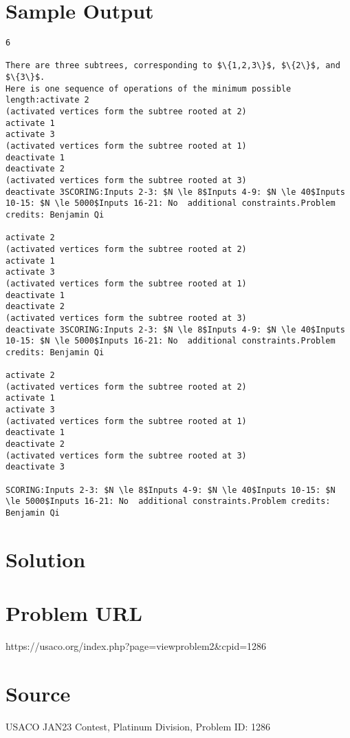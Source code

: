 \documentclass[12pt]{article}
\begin{document}
\section*{Sample Output}
\begin{verbatim}
6

There are three subtrees, corresponding to $\{1,2,3\}$, $\{2\}$, and $\{3\}$.
Here is one sequence of operations of the minimum possible length:activate 2
(activated vertices form the subtree rooted at 2)
activate 1
activate 3
(activated vertices form the subtree rooted at 1)
deactivate 1
deactivate 2
(activated vertices form the subtree rooted at 3)
deactivate 3SCORING:Inputs 2-3: $N \le 8$Inputs 4-9: $N \le 40$Inputs 10-15: $N \le 5000$Inputs 16-21: No  additional constraints.Problem credits: Benjamin Qi

activate 2
(activated vertices form the subtree rooted at 2)
activate 1
activate 3
(activated vertices form the subtree rooted at 1)
deactivate 1
deactivate 2
(activated vertices form the subtree rooted at 3)
deactivate 3SCORING:Inputs 2-3: $N \le 8$Inputs 4-9: $N \le 40$Inputs 10-15: $N \le 5000$Inputs 16-21: No  additional constraints.Problem credits: Benjamin Qi

activate 2
(activated vertices form the subtree rooted at 2)
activate 1
activate 3
(activated vertices form the subtree rooted at 1)
deactivate 1
deactivate 2
(activated vertices form the subtree rooted at 3)
deactivate 3

SCORING:Inputs 2-3: $N \le 8$Inputs 4-9: $N \le 40$Inputs 10-15: $N \le 5000$Inputs 16-21: No  additional constraints.Problem credits: Benjamin Qi
\end{verbatim}

\section*{Solution}


\section*{Problem URL}
https://usaco.org/index.php?page=viewproblem2&cpid=1286

\section*{Source}
USACO JAN23 Contest, Platinum Division, Problem ID: 1286
\end{document}
